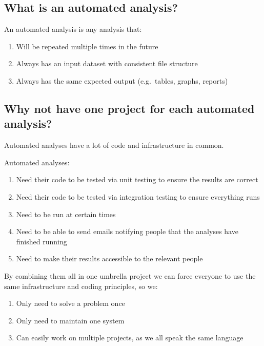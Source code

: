 \documentclass[12pt,]{article}
\providecommand{\tightlist}{%
  \setlength{\itemsep}{0pt}\setlength{\parskip}{0pt}}
\begin{document}
\subsection{What is an automated
analysis?}\label{what-is-an-automated-analysis}

An automated analysis is any analysis that:

\begin{enumerate}
\def\labelenumi{\arabic{enumi}.}
\tightlist
\item
  Will be repeated multiple times in the future
\item
  Always has an input dataset with consistent file structure
\item
  Always has the same expected output (e.g.~tables, graphs, reports)
\end{enumerate}

\subsection{Why not have one project for each automated
analysis?}\label{why-not-have-one-project-for-each-automated-analysis}

Automated analyses have a lot of code and infrastructure in common.

Automated analyses:

\begin{enumerate}
\def\labelenumi{\arabic{enumi}.}
\tightlist
\item
  Need their code to be tested via unit testing to ensure the results
  are correct
\item
  Need their code to be tested via integration testing to ensure
  everything runs
\item
  Need to be run at certain times
\item
  Need to be able to send emails notifying people that the analyses have
  finished running
\item
  Need to make their results accessible to the relevant people
\end{enumerate}

By combining them all in one umbrella project we can force everyone to
use the same infrastructure and coding principles, so we:

\begin{enumerate}
\def\labelenumi{\arabic{enumi}.}
\tightlist
\item
  Only need to solve a problem once
\item
  Only need to maintain one system
\item
  Can easily work on multiple projects, as we all speak the same
  language
\end{enumerate}
\end{document}
